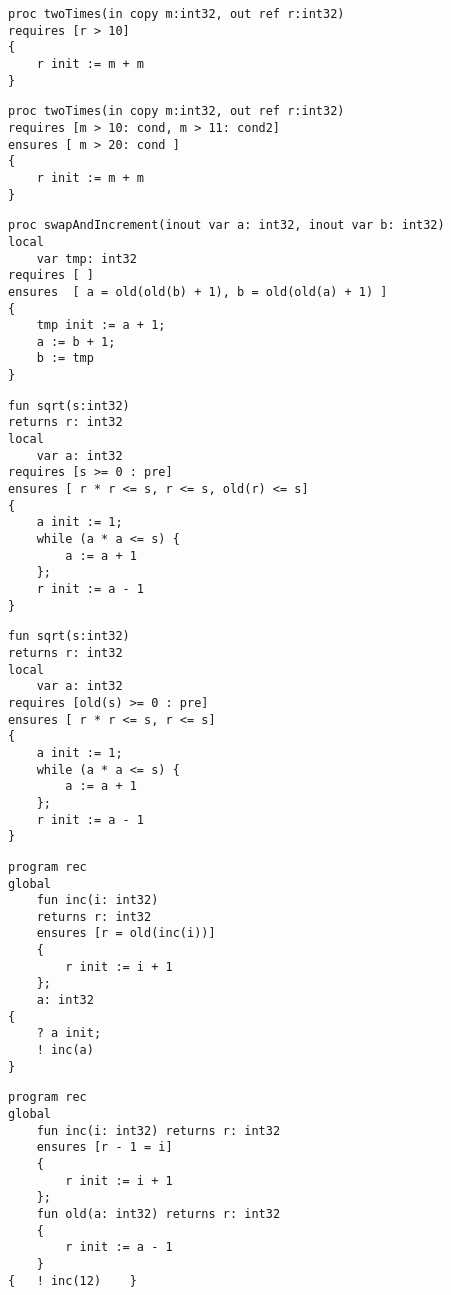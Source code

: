 \begin{lstlisting}[caption=Fehler: Zugriff auf out Parameter in precondition.]
proc twoTimes(in copy m:int32, out ref r:int32)
requires [r > 10]
{
    r init := m + m
}
\end{lstlisting}

\begin{lstlisting}[caption=Fehler: Gleiche Labels in Conditions derselben Routine.]
proc twoTimes(in copy m:int32, out ref r:int32)
requires [m > 10: cond, m > 11: cond2]
ensures [ m > 20: cond ]
{
    r init := m + m
}
\end{lstlisting}

\begin{lstlisting}[caption=Fehler: Auf die Funktion old darf im preexecution State nicht zugegriffen werden.]
proc swapAndIncrement(inout var a: int32, inout var b: int32)
local 
    var tmp: int32
requires [ ]
ensures  [ a = old(old(b) + 1), b = old(old(a) + 1) ]
{
    tmp init := a + 1;
    a := b + 1;
    b := tmp
}

\end{lstlisting}
                                                                         
\begin{lstlisting}[caption=Fehler: Zugriff auf uninitialisierter Wert in preexecution State mittels old]
fun sqrt(s:int32)
returns r: int32
local 
    var a: int32
requires [s >= 0 : pre]
ensures [ r * r <= s, r <= s, old(r) <= s]
{
    a init := 1;
    while (a * a <= s) {
        a := a + 1
    };      
    r init := a - 1
}
\end{lstlisting}


\begin{lstlisting}[caption=Fehler: Zugriff auf Funktion old in precondition]
fun sqrt(s:int32)
returns r: int32
local 
    var a: int32
requires [old(s) >= 0 : pre]
ensures [ r * r <= s, r <= s]
{
    a init := 1;
    while (a * a <= s) {
        a := a + 1
    };      
    r init := a - 1
}
\end{lstlisting}

\begin{lstlisting}[caption=Fehler: Rekursiver Aufruf in condition.]
program rec
global
    fun inc(i: int32)
    returns r: int32
    ensures [r = old(inc(i))]
    {
        r init := i + 1
    };
    a: int32
{
    ? a init;
    ! inc(a)    
}
\end{lstlisting}

\begin{lstlisting}[caption=Fehler: Namenskonflikt mit reservierter Funktion old.]
program rec
global
	fun inc(i: int32) returns r: int32
	ensures [r - 1 = i]
	{
		r init := i + 1
	};
	fun old(a: int32) returns r: int32
	{
		r init := a - 1
	}
{	! inc(12)    }
\end{lstlisting}

